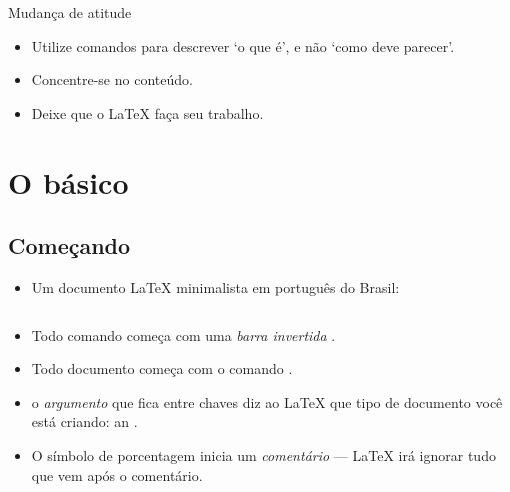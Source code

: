 \documentclass{beamer}
\begin{document}
\begin{frame}[fragile]{Mudança de atitude}

\begin{itemize}
\item Utilize comandos para descrever `o que é', e não  `como deve parecer'.
\item Concentre-se no conteúdo.
\item Deixe que o \LaTeX{} faça seu trabalho.
\end{itemize}
\end{frame}

\section{O básico}

\subsection{Começando}
\begin{frame}[fragile]{\insertsubsection}
\begin{itemize}
\item Um documento  \LaTeX{} minimalista em português do Brasil:
\inputminted[frame=single]{latex}{basics.tex}
\item Todo comando começa com uma \emph{barra invertida} \keystrokebftt{\bs}.
\item Todo documento começa com o comando
 .
\item o \emph{argumento} que fica entre chaves \keystrokebftt{\{}
\keystrokebftt{\}} diz ao \LaTeX{} que tipo de documento você está criando:
an .
\item O símbolo de porcentagem \keystrokebftt{\%} inicia um  \emph{comentário}
--- \LaTeX{} irá ignorar tudo que vem após o comentário.
\end{itemize}
\end{frame}
\end{document}
